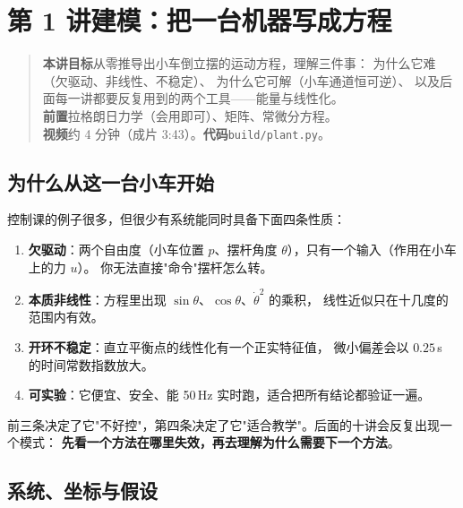 \chapter[建模]{第 1 讲\quad 建模：把一台机器写成方程}
\label{ch:model}

\begin{quote}\small
\textbf{本讲目标}\quad 从零推导出小车倒立摆的运动方程，理解三件事：
为什么它难（欠驱动、非线性、不稳定）、
为什么它可解（小车通道恒可逆）、
以及后面每一讲都要反复用到的两个工具——能量与线性化。\\[2pt]
\textbf{前置}\quad 拉格朗日力学（会用即可）、矩阵、常微分方程。\\
\textbf{视频}\quad 约 4 分钟（成片 3:43）。\quad\textbf{代码}\quad \texttt{build/plant.py}。
\end{quote}

\section{为什么从这一台小车开始}

控制课的例子很多，但很少有系统能同时具备下面四条性质：

\begin{enumerate}[leftmargin=2em,itemsep=3pt]
  \item \textbf{欠驱动}：两个自由度（小车位置 $p$、摆杆角度 $\theta$），只有一个输入（作用在小车上的力 $u$）。
        你无法直接"命令"摆杆怎么转。
  \item \textbf{本质非线性}：方程里出现 $\sin\theta$、$\cos\theta$、$\dot\theta^2$ 的乘积，
        线性近似只在十几度的范围内有效。
  \item \textbf{开环不稳定}：直立平衡点的线性化有一个正实特征值，
        微小偏差会以 $0.25$\,s 的时间常数指数放大。
  \item \textbf{可实验}：它便宜、安全、能 50\,Hz 实时跑，适合把所有结论都验证一遍。
\end{enumerate}

前三条决定了它"不好控"，第四条决定了它"适合教学"。后面的十讲会反复出现一个模式：
\textbf{先看一个方法在哪里失效，再去理解为什么需要下一个方法}。

\section{系统、坐标与假设}


